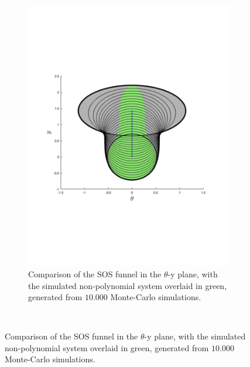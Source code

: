 \begin{figure}
\begin{subfigure}{0.5\textwidth}
    \includegraphics[trim={0cm 6cm 0cm 6cm},
    width=\textwidth]{figures/method/FunnelSimythetafunnel}
    \caption{Comparison of the \ac{SOS} funnel in the \(\theta\)-y plane, with
      the simulated non-polynomial system overlaid in green, generated from
      \(10.000\) Monte-Carlo simulations.}
  \end{subfigure}%
  \\
\end{figure}
